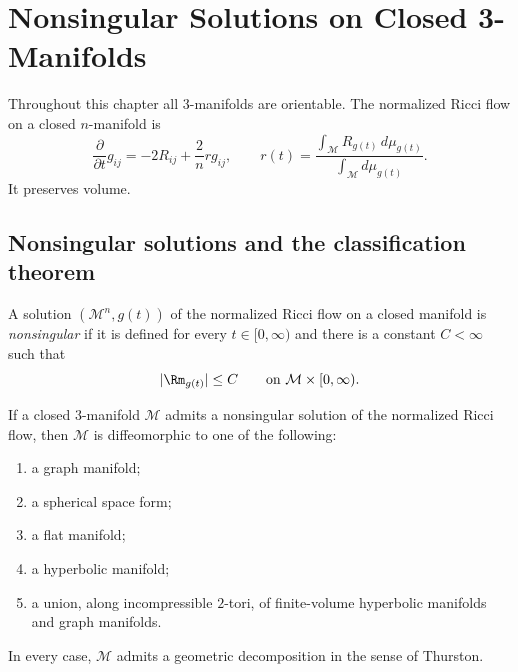 \chapter[32]{Nonsingular Solutions on Closed 3-Manifolds}
\label{ch:chow-iv-nonsingular-solutions-closed-three-manifolds}

Throughout this chapter all $3$-manifolds are orientable.  The normalized
Ricci flow on a closed $n$-manifold is
\begin{equation*}
 \frac{\partial}{\partial t}g_{ij}
 =-2R_{ij}+\frac{2}{n}r g_{ij},
 \qquad
 r(t)=\frac{\int_{\mathcal M}R_{g(t)}\,d\mu_{g(t)}}
 {\int_{\mathcal M}d\mu_{g(t)}}.
 \tag{32.1}
\end{equation*}
It preserves volume.

\section{Nonsingular solutions and the classification theorem}

\begin{definition}
\label{def:chow-iv-nonsingular-solution}
A solution $(\mathcal M^n,g(t))$ of the normalized Ricci flow on a closed
manifold is \emph{nonsingular} if it is defined for every
$t\in[0,\infty)$ and there is a constant $C<\infty$ such that
\[
 |\Rm_{g(t)}|\le C
 \qquad\text{on }\mathcal M\times[0,\infty).
\]
\end{definition}

\begin{theorem}
\label{thm:chow-iv-nonsingular-geometric-decomposition}
If a closed $3$-manifold $\mathcal M$ admits a nonsingular solution of the
normalized Ricci flow, then $\mathcal M$ is diffeomorphic to one of the
following:
\begin{enumerate}
\item a graph manifold;
\item a spherical space form;
\item a flat manifold;
\item a hyperbolic manifold;
\item a union, along incompressible $2$-tori, of finite-volume hyperbolic
manifolds and graph manifolds.
\end{enumerate}
In every case, $\mathcal M$ admits a geometric decomposition in the sense of
Thurston.
\end{theorem}

